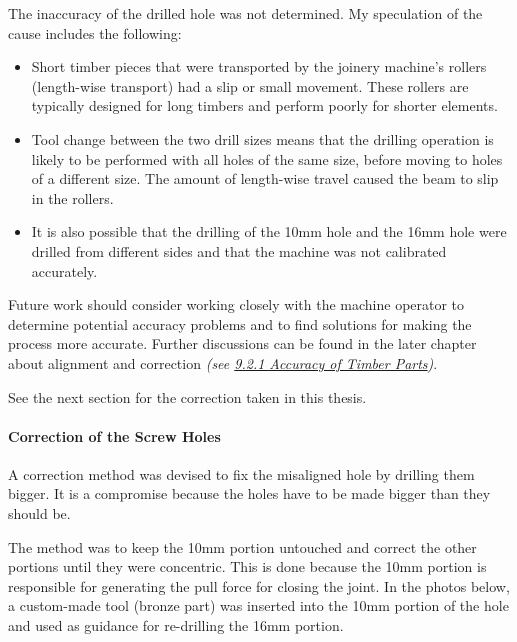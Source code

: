 \documentclass[11pt]{book}
\begin{document}
The inaccuracy of the drilled hole was not determined. My speculation of the cause includes the following:

\begin{itemize}
	\item Short timber pieces that were transported by the joinery machine’s rollers (length-wise transport) had a slip or small movement. These rollers are typically designed for long timbers and perform poorly for shorter elements.

	\item Tool change between the two drill sizes means that the drilling operation is likely to be performed with all holes of the same size, before moving to holes of a different size. The amount of length-wise travel caused the beam to slip in the rollers.

	\item It is also possible that the drilling of the 10mm hole and the 16mm hole were drilled from different sides and that the machine was not calibrated accurately. 

\end{itemize}
Future work should consider working closely with the machine operator to determine potential accuracy problems and to find solutions for making the process more accurate. Further discussions can be found in the later chapter about alignment and correction \textit{(see \uline{9.2.1 Accuracy of Timber Parts})}.

See the next section for the correction taken in this thesis.

\paragraph{Correction of the Screw Holes}

A correction method was devised to fix the misaligned hole by drilling them bigger. It is a compromise because the holes have to be made bigger than they should be. 

The method was to keep the 10mm portion untouched and correct the other portions until they were concentric. This is done because the 10mm portion is responsible for generating the pull force for closing the joint. In the photos below, a custom-made tool (bronze part) was inserted into the 10mm portion of the hole and used as guidance for re-drilling the 16mm portion.
\end{document}
